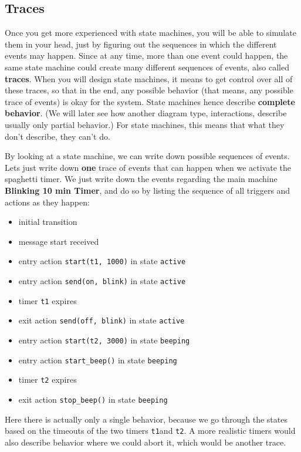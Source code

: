 \documentclass[10pt, twoside, twocolumn]{book}
\providecommand{\tightlist}{%
  \setlength{\itemsep}{0pt}\setlength{\parskip}{0pt}}
\begin{document}
\hypertarget{traces}{%
\subsection{Traces}\label{traces}}

Once you get more experienced with state machines, you will be able to
simulate them in your head, just by figuring out the sequences in which
the different events may happen. Since at any time, more than one event
could happen, the same state machine could create many different
sequences of events, also called \textbf{traces}. When you will design
state machines, it means to get control over all of these traces, so
that in the end, any possible behavior (that means, any possible trace
of events) is okay for the system. State machines hence describe
\textbf{complete behavior}. (We will later see how another diagram type,
interactions, describe usually only partial behavior.) For state
machines, this means that what they don't describe, they can't do.

By looking at a state machine, we can write down possible sequences of
events. Lets just write down \textbf{one} trace of events that can
happen when we activate the spaghetti timer. We just write down the
events regarding the main machine \textbf{Blinking 10 min Timer}, and do
so by listing the sequence of all triggers and actions as they happen:

\begin{itemize}
\tightlist
\item
  initial transition
\item
  message start received
\item
  entry action \texttt{start(t1,\ 1000)} in state \texttt{active}
\item
  entry action \texttt{send(on,\ blink)} in state \texttt{active}
\item
  timer \texttt{t1} expires
\item
  exit action \texttt{send(off,\ blink)} in state \texttt{active}
\item
  entry action \texttt{start(t2,\ 3000)} in state \texttt{beeping}
\item
  entry action \texttt{start\_beep()} in state \texttt{beeping}
\item
  timer \texttt{t2} expires
\item
  exit action \texttt{stop\_beep()} in state \texttt{beeping}
\end{itemize}

Here there is actually only a single behavior, because we go through the
states based on the timeouts of the two timers \texttt{t1}and
\texttt{t2}. A more realistic timers would also describe behavior where
we could abort it, which would be another trace.
\end{document}
